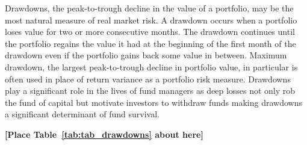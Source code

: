 Drawdowns, the peak-to-trough decline in the value of a portfolio, may be the most natural measure of real market risk. \citep{magdon-ismail_maximum_2006} A drawdown occurs when a portfolio loses value for two or more consecutive months. The drawdown continues until the portfolio regains the value it had at the beginning of the first month of the drawdown even if the portfolio gains back some value in between. Maximum drawdown, the largest peak-to-trough decline in portfolio value, in particular is often used in place of return variance as a portfolio risk measure. \citep{johansen_large_2000,articlev1,noauthor_sornette_nodate} Drawdowns play a significant role in the lives of fund managers as deep losses not only rob the fund of capital but motivate investors to withdraw funds making drawdowns a significant determinant of fund survival. \citep{baba_hedge_nodate,papaioannou_procyclical_2013,lang_2006} %

\bigskip
\centerline{\bf [Place Table~\ref{tab:tab_drawdowns} about here]}
\bigskip


